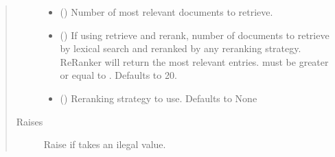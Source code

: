 \documentclass[letterpaper,10pt,english]{sphinxmanual}
\begin{document}
\begin{fulllineitems}
\begin{fulllineitems}
\begin{quote}
\begin{description}
\begin{itemize}
\item {} 
 (\sphinxstyleliteralemphasis{\sphinxupquote{, }}) \textendash{} Number of most relevant documents to retrieve.

\item {} 
 (\sphinxstyleliteralemphasis{\sphinxupquote{, }}) \textendash{} If using retrieve and re\sphinxhyphen{}rank, number of documents to
retrieve by lexical search and re\sphinxhyphen{}ranked by any re\sphinxhyphen{}ranking strategy. Re\sphinxhyphen{}Ranker
will return the  most relevant entries.  must be greater or equal
to . Defaults to 20.

\item {} 
 (\sphinxstyleliteralemphasis{\sphinxupquote{{[}}}\sphinxstyleliteralemphasis{\sphinxupquote{, }}\sphinxstyleliteralemphasis{\sphinxupquote{{]}}}\sphinxstyleliteralemphasis{\sphinxupquote{, }}) \textendash{} Re\sphinxhyphen{}ranking strategy to use. Defaults to None

\end{itemize}

\item[{Raises}] \leavevmode
{} \textendash{} Raise  if  takes an ilegal
value.

\end{description}\end{quote}

\end{fulllineitems}



\end{fulllineitems}
\end{document}
